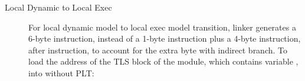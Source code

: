 \begin{description}
\item[Local Dynamic to Local Exec]
For local dynamic model to local exec model transition, linker generates
a 6-byte  instruction, instead of a 1-byte 
instruction plus a 4-byte  instruction, after 
instruction, to account for the extra byte with indirect branch.  To load
the address of the TLS block of the module, which contains variable
, into  without PLT:

\begin{table}[H]
\Hrule
\caption{LD -> LE Code Transition}
\begin{center}
\myfontsize{}
\end{center}
\Hrule
\end{table}

\end{description}

